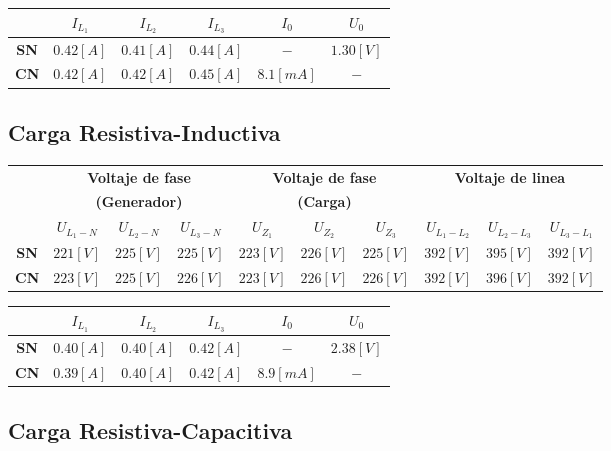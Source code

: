 \documentclass[letter,11pt]{article}
\begin{document}
\begin{center}
    \begin{tabular}{|c||c|c|c||c|c|}
    \hline
    & $I_{L_1}$ & $I_{L_2}$ & $I_{L_3}$ & $I_0$ & $U_0$
    \tabularnewline \hline \hline
    \textbf{SN} & $0.42[A]$ & $0.41[A]$ & $0.44[A]$ & $-$ & $1.30[V]$
    \tabularnewline \hline
    \textbf{CN} & $0.42[A]$ & $0.42[A]$ & $0.45[A]$ & $8.1[mA]$ & $-$
    \tabularnewline \hline
    \end{tabular}
\end{center}

\subsection{Carga Resistiva-Inductiva}

\begin{center}
    \begin{tabular}{|c||c|c|c||c|c|c||c|c|c|}
    \hline
    & \multicolumn{3}{c||}{\textbf{Voltaje de fase}} & \multicolumn{3}{c||}{\textbf{Voltaje de fase}} & \multicolumn{3}{c|}{\textbf{Voltaje de linea}}
    \tabularnewline
    & \multicolumn{3}{c||}{\textbf{(Generador)}} & \multicolumn{3}{c||}{\textbf{(Carga)}} & \multicolumn{3}{c|}{}
    \tabularnewline \hline
    & $U_{L_1-N}$ & $U_{L_2-N}$ & $U_{L_3-N}$ & $U_{Z_1}$ & $U_{Z_2}$ & $U_{Z_3}$ & $U_{L_1-L_2}$ & $U_{L_2-L_3}$ & $U_{L_3-L_1}$
    \tabularnewline \hline \hline
    \textbf{SN} & $221[V]$ & $225[V]$ & $225[V]$ & $223[V]$ & $226[V]$ & $225[V]$ & $392[V]$ & $395[V]$ & $392[V]$
    \tabularnewline \hline
    \textbf{CN} & $223[V]$ & $225[V]$ & $226[V]$ & $223[V]$ & $226[V]$ & $226[V]$ & $392[V]$ & $396[V]$ & $392[V]$
    \tabularnewline \hline
    \end{tabular}
\end{center}

\begin{center}
    \begin{tabular}{|c||c|c|c||c|c|}
    \hline
    & $I_{L_1}$ & $I_{L_2}$ & $I_{L_3}$ & $I_0$ & $U_0$
    \tabularnewline \hline \hline
    \textbf{SN} & $0.40[A]$ & $0.40[A]$ & $0.42[A]$ & $-$ & $2.38[V]$
    \tabularnewline \hline
    \textbf{CN} & $0.39[A]$ & $0.40[A]$ & $0.42[A]$ & $8.9[mA]$ & $-$
    \tabularnewline \hline
    \end{tabular}
\end{center}

\subsection{Carga Resistiva-Capacitiva}
\end{document}
